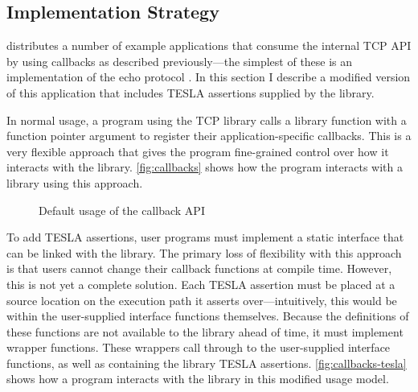 \subsection{Implementation Strategy}

\lwip{} distributes a number of example applications that consume the internal TCP
API by using callbacks as described previously---the simplest of these is an
implementation of the echo protocol \cite{RFC0862}. In this section I describe a
modified version of this application that includes TESLA assertions supplied by
the library.

In normal usage, a program using the \lwip{} TCP library calls a library function
with a function pointer argument to register their application-specific
callbacks. This is a very flexible approach that gives the program fine-grained
control over how it interacts with the library. \autoref{fig:callbacks} shows
how the program interacts with a library using this approach.

\begin{figure}
  \centering
  \caption{Default usage of the \lwip{} callback API}
  \label{fig:callbacks}
\end{figure}

To add TESLA assertions, user programs must implement a static interface that
can be linked with the library. The primary loss of flexibility with this
approach is that users cannot change their callback functions at compile time.
However, this is not yet a complete solution. Each TESLA assertion must be
placed at a source location on the execution path it asserts over---intuitively,
this would be within the user-supplied interface functions themselves. Because
the definitions of these functions are not available to the library ahead of
time, it must implement wrapper functions. These wrappers call through to the
user-supplied interface functions, as well as containing the library TESLA
assertions. \autoref{fig:callbacks-tesla} shows how a program interacts with the
library in this modified usage model.

